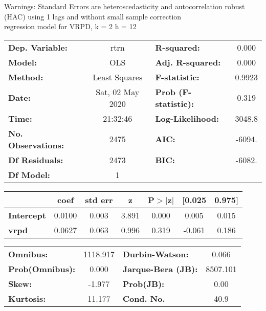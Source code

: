 Warnings: \newline
 [1] Standard Errors are heteroscedasticity and autocorrelation robust (HAC) using 1 lags and without small sample correction\\ 

regression model for VRPD, k = 2 h = 12\begin{center}
\begin{tabular}{lclc}
\toprule
\textbf{Dep. Variable:}    &       rtrn       & \textbf{  R-squared:         } &     0.000   \\
\textbf{Model:}            &       OLS        & \textbf{  Adj. R-squared:    } &     0.000   \\
\textbf{Method:}           &  Least Squares   & \textbf{  F-statistic:       } &    0.9923   \\
\textbf{Date:}             & Sat, 02 May 2020 & \textbf{  Prob (F-statistic):} &    0.319    \\
\textbf{Time:}             &     21:32:46     & \textbf{  Log-Likelihood:    } &    3048.8   \\
\textbf{No. Observations:} &        2475      & \textbf{  AIC:               } &    -6094.   \\
\textbf{Df Residuals:}     &        2473      & \textbf{  BIC:               } &    -6082.   \\
\textbf{Df Model:}         &           1      & \textbf{                     } &             \\
\bottomrule
\end{tabular}
\begin{tabular}{lcccccc}
                   & \textbf{coef} & \textbf{std err} & \textbf{z} & \textbf{P$> |$z$|$} & \textbf{[0.025} & \textbf{0.975]}  \\
\midrule
\textbf{Intercept} &       0.0100  &        0.003     &     3.891  &         0.000        &        0.005    &        0.015     \\
\textbf{vrpd}      &       0.0627  &        0.063     &     0.996  &         0.319        &       -0.061    &        0.186     \\
\bottomrule
\end{tabular}
\begin{tabular}{lclc}
\textbf{Omnibus:}       & 1118.917 & \textbf{  Durbin-Watson:     } &    0.066  \\
\textbf{Prob(Omnibus):} &   0.000  & \textbf{  Jarque-Bera (JB):  } & 8507.101  \\
\textbf{Skew:}          &  -1.977  & \textbf{  Prob(JB):          } &     0.00  \\
\textbf{Kurtosis:}      &  11.177  & \textbf{  Cond. No.          } &     40.9  \\
\bottomrule
\end{tabular}
\end{center}


